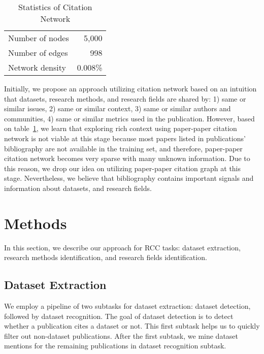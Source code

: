 \begin{table}[t!]
\begin{center}
\begin{tabular}{|l|r|}
\hline
Number of nodes & 5,000  \\
Number of edges & 998 \\
Network density & 0.008\% \\
\hline
\end{tabular}
\end{center}
\caption{\label{tab:network_stats} Statistics of Citation Network}
\end{table}

Initially, we propose an approach utilizing citation network based on an intuition that datasets, research methods, and research fields are shared by: 1) same or similar issues, 2) same or similar context, 3) same or similar authors and communities, 4) same or similar metrics used in the publication. However, based on table~\ref{tab:network_stats}, we learn that exploring rich context using paper-paper citation network is not viable at this stage because most papers listed in publications' bibliography are not available in the training set, and therefore, paper-paper citation network becomes very sparse with many unknown information. Due to this reason, we drop our idea on utilizing paper-paper citation graph at this stage. Nevertheless, we believe that bibliography contains important signals and information about datasets, and research fields.


\section{Methods}
\label{sec:methods}

In this section, we describe our approach for RCC tasks: dataset extraction, research methods identification, and research fields identification.

\subsection{Dataset Extraction}
\label{ssec:dataset_extraction}

We employ a pipeline of two subtasks for dataset extraction: dataset detection, followed by dataset recognition. The goal of dataset detection is to detect whether a publication cites a dataset or not. This first subtask helps us to quickly filter out non-dataset publications. After the first subtask, we mine dataset mentions for the remaining publications in dataset recognition subtask.

